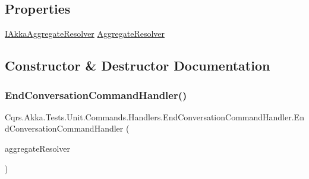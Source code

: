 \subsection*{Properties}
\begin{DoxyCompactItemize}
\item 
\hyperlink{interfaceCqrs_1_1Akka_1_1Domain_1_1IAkkaAggregateResolver}{I\+Akka\+Aggregate\+Resolver} \hyperlink{classCqrs_1_1Akka_1_1Tests_1_1Unit_1_1Commands_1_1Handlers_1_1EndConversationCommandHandler_a39a99dda0cbadd3405a4a991fd3f2163_a39a99dda0cbadd3405a4a991fd3f2163}{Aggregate\+Resolver}
\end{DoxyCompactItemize}


\subsection{Constructor \& Destructor Documentation}
\mbox{\label{classCqrs_1_1Akka_1_1Tests_1_1Unit_1_1Commands_1_1Handlers_1_1EndConversationCommandHandler_aaf3680b69f6cbad95722194c4c16cd1f_aaf3680b69f6cbad95722194c4c16cd1f}} 
\subsubsection{\texorpdfstring{End\+Conversation\+Command\+Handler()}{EndConversationCommandHandler()}}
{\footnotesize\ttfamily Cqrs.\+Akka.\+Tests.\+Unit.\+Commands.\+Handlers.\+End\+Conversation\+Command\+Handler.\+End\+Conversation\+Command\+Handler (\begin{DoxyParamCaption}\item[{\hyperlink{interfaceCqrs_1_1Akka_1_1Domain_1_1IAkkaAggregateResolver}{I\+Akka\+Aggregate\+Resolver}}]{aggregate\+Resolver }\end{DoxyParamCaption})}



